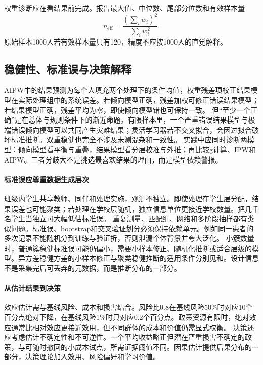 权重诊断应在看结果前完成。报告最大值、中位数、尾部分位数和有效样本量
\[
n_{\mathrm{eff}}=\frac{(\sum_iw_i)^2}{\sum_iw_i^2}.
\]
原始样本1000人若有效样本量只有120，精度不应按1000人的直觉解释。

\subsection{稳健性、标准误与决策解释}

AIPW中的结果预测为每个人填充两个处理下的条件均值，权重残差项校正结果模型在实际处理组中的系统误差。若倾向模型正确，残差加权可修正错误结果模型；若结果模型正确，残差平均为零，即使倾向模型错也可保持一致。
但“至少一个正确”是在总体与规则条件下的渐近命题。有限样本里，一个严重错误结果模型与极端错误倾向模型可以共同产生灾难结果；灵活学习器若不交叉拟合，会因过拟合破坏标准推断。双重稳健也完全不涉及未测混杂和一致性。
实践中应同时诊断两模型：倾向模型看平衡与重叠，结果模型看分层校准与外推；再比较g计算、IPW和AIPW。三者分歧大不是挑选最喜欢结果的理由，而是模型依赖警报。

\paragraph{标准误应尊重数据生成层次}

班级内学生共享教师、同伴和处理实施，观测不独立。即使处理在学生层分配，结果误差也可能聚类；若处理在学校层随机，独立信息单位更接近学校数量。把几千名学生当独立可大幅低估标准误。
重复测量、匹配组、网络和多阶段抽样都有类似问题。标准误、bootstrap和交叉验证划分必须保持依赖单元。例如同一患者的多次记录不能随机分到训练与验证折，否则泄漏个体背景并夸大泛化。
小簇数量时，普通簇稳健标准误可能仍偏小，需要小样本修正、随机化推断或适合层级的模型。异方差稳健方差的小样本修正与聚类稳健推断的适用条件分别见\textcite{mackinnonwhite1985}和\textcite{cameronmiller2015}。设计信息不是采集完后可丢弃的元数据，而是推断分布的一部分。

\paragraph{从估计结果到决策}

效应估计需与基线风险、成本和损害结合。风险比0.8在基线风险50\%时对应10个百分点绝对下降，在基线风险1\%时只对应0.2个百分点。政策资源有限时，绝对效应通常比相对效应更接近效用，但不同群体的成本和价值仍需显式权衡。
决策还应考虑估计不确定性和不可逆性。一个平均收益略正但潜在严重损害不确定的政策，与可随时撤回的小成本试点，所需证据阈值不同。因果估计提供后果分布的一部分，决策理论加入效用、风险偏好和学习价值。

